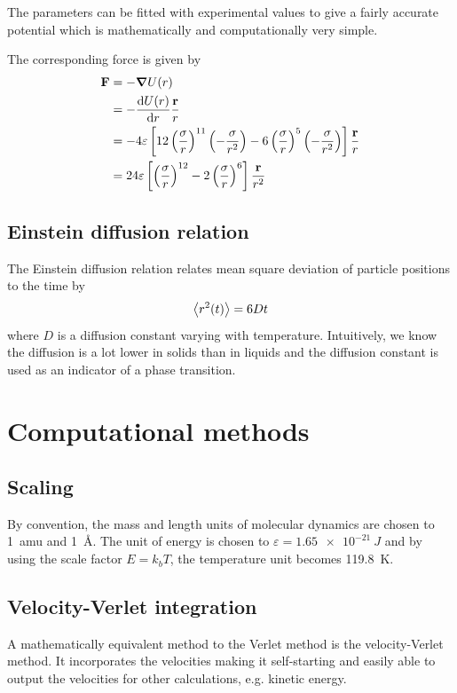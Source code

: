 \documentclass[fleqn]{scrartcl}
\renewcommand{\epsilon}{\varepsilon}
\begin{document}
	The parameters can be fitted with experimental values to give a fairly accurate potential which is mathematically and computationally very simple.
	
	The corresponding force is given by
	\begin{align}
		\vb{F} &= -\grad{U(r)} \\
		&= -\dv{U(r)}{r}\frac{\vb{r}}{r} \\
		&= -4\epsilon\left[12\left(\frac{\sigma}{r}\right)^{11}\left(-\frac{\sigma}{r^2}\right)-6\left(\frac{\sigma}{r}\right)^5\left(-\frac{\sigma}{r^2}\right)\right]\frac{\vb{r}}{r} \\
		&= 24\epsilon\left[\left(\frac{\sigma}{r}\right)^{12}-2\left(\frac{\sigma}{r}\right)^6\right]\frac{\vb{r}}{r^2} 
	\end{align}

	\subsection{Einstein diffusion relation}
	The Einstein diffusion relation relates mean square deviation of particle positions to the time by
	\begin{equation}
		\expval{r^2(t)}=6Dt
	\end{equation}
	where $D$ is a diffusion constant varying with temperature. Intuitively, we know the diffusion is a lot lower in solids than in liquids and the diffusion constant is used as an indicator of a phase transition.

	\section{Computational methods}
	\subsection{Scaling}
	By convention, the mass and length units of molecular dynamics are chosen to \SI{1}{amu} and \SI{1}{\angstrom}. The unit of energy is chosen to $\epsilon=\SI{1.65e-21}{J}$ and by using the scale factor $E=k_bT$, the temperature unit becomes \SI{119.8}{K}.
	
	\subsection{Velocity-Verlet integration}
	A mathematically equivalent method to the Verlet method is the velocity-Verlet method. It incorporates the velocities making it self-starting and easily able to output the velocities for other calculations, e.g. kinetic energy.
	
\end{document}
